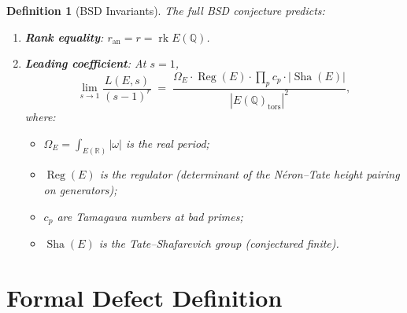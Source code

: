 \documentclass[11pt]{article}
\newtheorem{definition}[lemma]{Definition}
\theoremstyle{definition}
\DeclareMathOperator{\rk}{rk}
\DeclareMathOperator{\Reg}{Reg}
\DeclareMathOperator{\Sha}{Sha}
\begin{document}
\begin{definition}[BSD Invariants]
\label{def:bsd-invariants}
The full BSD conjecture predicts:
\begin{enumerate}
  \item \textbf{Rank equality}: $r_{\mathrm{an}} = r = \rk E(\mathbb{Q})$.
  \item \textbf{Leading coefficient}: At $s = 1$,
    \[
      \lim_{s \to 1} \frac{L(E, s)}{(s-1)^r} \;=\;
      \frac{\Omega_E \cdot \Reg(E) \cdot \prod_p c_p \cdot |\Sha(E)|}{|E(\mathbb{Q})_{\mathrm{tors}}|^2},
    \]
    where:
    \begin{itemize}
      \item $\Omega_E = \int_{E(\mathbb{R})} |\omega|$ is the real period;
      \item $\Reg(E)$ is the regulator (determinant of the N\'eron--Tate height pairing on generators);
      \item $c_p$ are Tamagawa numbers at bad primes;
      \item $\Sha(E)$ is the Tate--Shafarevich group (conjectured finite).
    \end{itemize}
\end{enumerate}
\end{definition}

\section{Formal Defect Definition}
\end{document}
